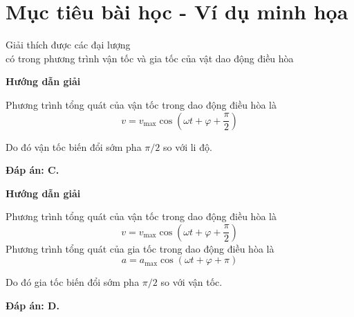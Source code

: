 \section{Mục tiêu bài học - Ví dụ minh họa}
\begin{dang}{Giải thích được các đại lượng\\ có trong phương trình vận tốc và gia tốc của vật dao động điều hòa}
	{\begin{center}
			\textbf{Hướng dẫn giải}
		\end{center}
		
		Phương trình tổng quát của vận tốc trong dao động điều hòa là $$v=v_\text{max}\cos \left( \omega t+\varphi+\dfrac{\pi}{2}\right)$$
		
		Do đó vận tốc biến đổi sớm pha $\pi / 2$ so với li độ.
		
		\textbf{Đáp án: C.}
	}
	{\begin{center}
			\textbf{Hướng dẫn giải}
		\end{center}
		
		Phương trình tổng quát của vận tốc trong dao động điều hòa là $$v=v_\text{max}\cos \left( \omega t+\varphi+\dfrac{\pi}{2}\right)$$
		Phương trình tổng quát của gia tốc trong dao động điều hòa là $$a=a_\text{max}\cos \left( \omega t+\varphi+ \pi\right)$$
		
		Do đó gia tốc biến đổi sớm pha $\pi / 2$ so với vận tốc.
		
		\textbf{Đáp án: D.}
	}
	
\end{dang}
